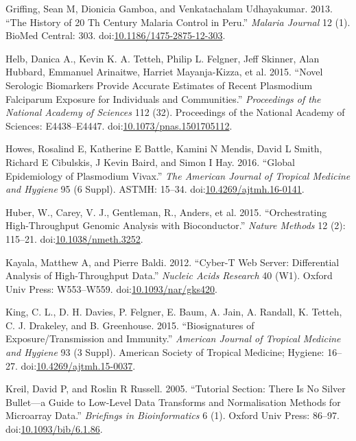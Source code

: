 \documentclass[a4paper]{article}
\begin{document}
\hypertarget{ref-griffing2013history}{}
Griffing, Sean M, Dionicia Gamboa, and Venkatachalam Udhayakumar. 2013.
``The History of 20 Th Century Malaria Control in Peru.'' \emph{Malaria
Journal} 12 (1). BioMed Central: 303.
doi:\href{https://doi.org/10.1186/1475-2875-12-303}{10.1186/1475-2875-12-303}.

\hypertarget{ref-Helb2015exposure}{}
Helb, Danica A., Kevin K. A. Tetteh, Philip L. Felgner, Jeff Skinner,
Alan Hubbard, Emmanuel Arinaitwe, Harriet Mayanja-Kizza, et al. 2015.
``Novel Serologic Biomarkers Provide Accurate Estimates of Recent
Plasmodium Falciparum Exposure for Individuals and Communities.''
\emph{Proceedings of the National Academy of Sciences} 112 (32).
Proceedings of the National Academy of Sciences: E4438--E4447.
doi:\href{https://doi.org/10.1073/pnas.1501705112}{10.1073/pnas.1501705112}.

\hypertarget{ref-howes2016global}{}
Howes, Rosalind E, Katherine E Battle, Kamini N Mendis, David L Smith,
Richard E Cibulskis, J Kevin Baird, and Simon I Hay. 2016. ``Global
Epidemiology of Plasmodium Vivax.'' \emph{The American Journal of
Tropical Medicine and Hygiene} 95 (6 Suppl). ASTMH: 15--34.
doi:\href{https://doi.org/10.4269/ajtmh.16-0141}{10.4269/ajtmh.16-0141}.

\hypertarget{ref-Biobase}{}
Huber, W., Carey, V. J., Gentleman, R., Anders, et al. 2015.
``Orchestrating High-Throughput Genomic Analysis with Bioconductor.''
\emph{Nature Methods} 12 (2): 115--21.
doi:\href{https://doi.org/10.1038/nmeth.3252}{10.1038/nmeth.3252}.

\hypertarget{ref-kayala2012cyber}{}
Kayala, Matthew A, and Pierre Baldi. 2012. ``Cyber-T Web Server:
Differential Analysis of High-Throughput Data.'' \emph{Nucleic Acids
Research} 40 (W1). Oxford Univ Press: W553--W559.
doi:\href{https://doi.org/10.1093/nar/gks420}{10.1093/nar/gks420}.

\hypertarget{ref-King2015FOC}{}
King, C. L., D. H. Davies, P. Felgner, E. Baum, A. Jain, A. Randall, K.
Tetteh, C. J. Drakeley, and B. Greenhouse. 2015. ``Biosignatures of
Exposure/Transmission and Immunity.'' \emph{American Journal of Tropical
Medicine and Hygiene} 93 (3 Suppl). American Society of Tropical
Medicine; Hygiene: 16--27.
doi:\href{https://doi.org/10.4269/ajtmh.15-0037}{10.4269/ajtmh.15-0037}.

\hypertarget{ref-kreil2005bullet}{}
Kreil, David P, and Roslin R Russell. 2005. ``Tutorial Section: There Is
No Silver Bullet---a Guide to Low-Level Data Transforms and
Normalisation Methods for Microarray Data.'' \emph{Briefings in
Bioinformatics} 6 (1). Oxford Univ Press: 86--97.
doi:\href{https://doi.org/10.1093/bib/6.1.86}{10.1093/bib/6.1.86}.
\end{document}
